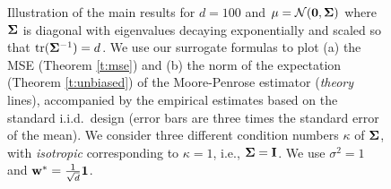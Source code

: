 \documentclass[11pt]{article}
\begin{document}
\begin{figure}[t]
  \centering
  \hfill
  \caption{Illustration of the main results for $d=100$ and
    $\mu=\mathcal{N}(\mathbf 0,\mathbf{\Sigma})$ where $\mathbf{\Sigma}$ is diagonal with
    eigenvalues decaying exponentially and scaled so that
    $\mathrm{tr}(\mathbf{\Sigma}^{-1})=d$. We use our surrogate
    formulas to plot (a) the MSE (Theorem \ref{t:mse}) and (b) the norm of the expectation (Theorem
    \ref{t:unbiased}) of the Moore-Penrose estimator (\emph{theory}
    lines), accompanied by the empirical estimates based on the standard
    i.i.d.~design (error bars are three times the standard error of the
    mean). We consider three different condition numbers $\kappa$ of
    $\mathbf{\Sigma}$, with \emph{isotropic} corresponding to $\kappa=1$,
    i.e., $\mathbf{\Sigma}=\mathbf I$. We use $\sigma^2=1$ and
    $\mathbf w^*=\frac1{\sqrt{d}}\mathbf 1$.}
  \label{f:intro}
\end{figure}
\end{document}
